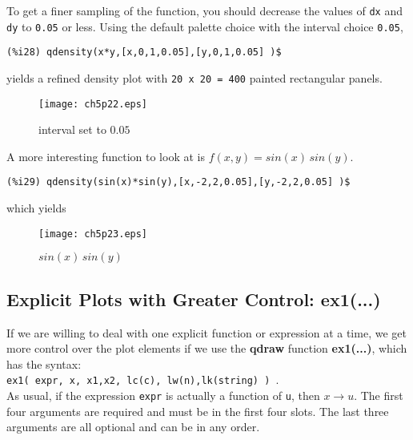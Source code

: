 \documentclass[12pt]{article}
\begin{document}
\newpage

To get a finer sampling of the function, you should decrease the values of
  \verb|dx| and \verb|dy| to \verb|0.05| or less.
Using the default palette choice with the interval choice \verb|0.05|, 
\small
\begin{verbatim}
(%i28) qdensity(x*y,[x,0,1,0.05],[y,0,1,0.05] )$
\end{verbatim}
\normalsize
yields a refined density plot with \verb|20 x 20 = 400| painted  rectangular panels.
\begin{figure} [h]
   \centerline{\texttt{[image: ch5p22.eps]} }
	\caption{interval set to $0.05$ }
\end{figure}      

\smallskip
A more interesting function to look at is $f(x,y) = sin(x)\,sin(y)$.
\small
\begin{verbatim}
(%i29) qdensity(sin(x)*sin(y),[x,-2,2,0.05],[y,-2,2,0.05] )$
\end{verbatim}
\normalsize
which yields
\begin{figure} [h]
   \centerline{\texttt{[image: ch5p23.eps]} }
	\caption{$sin(x)\,sin(y)$}
\end{figure}  

\smallskip
\newpage
    

\newpage

\subsection{Explicit Plots with Greater Control: ex1(...) }
If we are willing to deal with one explicit function or expression at a time,
  we get more control over the plot elements if we use the \textbf{qdraw} function
  \textbf{ex1(...)}, which has the syntax:\\
\verb|ex1( expr, x, x1,x2, lc(c), lw(n),lk(string) ) |.\\

\smallskip
As usual, if the expression \verb|expr| is actually a function of \verb|u|, then
  $x \rightarrow u$.
The first four arguments are required and must be in the first four slots.
The last three arguments are all optional and can be in any order.
\end{document}
